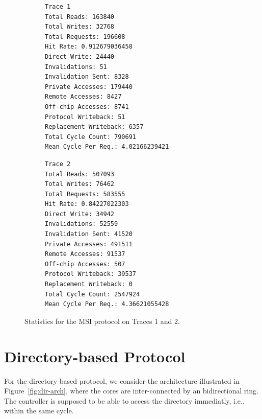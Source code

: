 \documentclass[12pt, a4paper, twoside]{article}
\begin{document}
\begin{figure}[h]
\centering
\begin{subfigure}{0.48\textwidth}
\begin{verbatim}
Trace 1
Total Reads: 163840
Total Writes: 32768
Total Requests: 196608
Hit Rate: 0.912679036458
Direct Write: 24440
Invalidations: 51
Invalidation Sent: 8328
Private Accesses: 179440
Remote Accesses: 8427
Off-chip Accesses: 8741
Protocol Writeback: 51
Replacement Writeback: 6357
Total Cycle Count: 790691
Mean Cycle Per Req.: 4.02166239421
\end{verbatim}
\end{subfigure}
\begin{subfigure}{0.48\textwidth}
\begin{verbatim}
Trace 2
Total Reads: 507093
Total Writes: 76462
Total Requests: 583555
Hit Rate: 0.84227022303
Direct Write: 34942
Invalidations: 52559
Invalidation Sent: 41520
Private Accesses: 491511
Remote Accesses: 91537
Off-chip Accesses: 507
Protocol Writeback: 39537
Replacement Writeback: 0
Total Cycle Count: 2547924
Mean Cycle Per Req.: 4.36621055428
\end{verbatim}
\end{subfigure}
\caption{Statistics for the MSI protocol on Traces 1 and 2.}
\end{figure}

\section{Directory-based Protocol} \label{sec:directory-based}

For the directory-based protocol, we consider the architecture illustrated in Figure~\ref{fig:dir-arch},
where the cores are inter-connected by an bidirectional ring.
The controller is supposed to be able to access the directory immediatly, i.e.,
within the same cycle.
\end{document}
